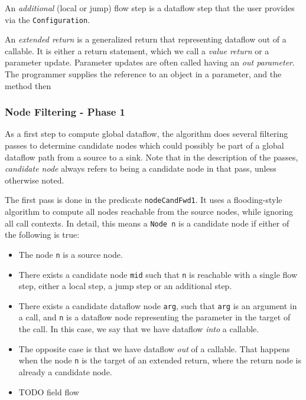 An \emph{additional} (local or jump) flow step is a dataflow step that the user 
provides via the \texttt{Configuration}.


An \emph{extended return} is a generalized return that representing dataflow out of a callable.
It is either a return statement, which we call a \emph{value return} or a parameter update.
Parameter updates are often called having an \emph{out parameter}.
The programmer supplies the reference to an object in a parameter, and the method then

\subsubsection*{Node Filtering - Phase 1}
As a first step to compute global dataflow, the algorithm does several filtering passes to 
determine candidate nodes which could possibly be part of a global dataflow path from
a source to a sink.
Note that in the description of the passes, \emph{candidate node} always refers
to being a candidate node in that pass, unless otherwise noted.

The first pass is done in the predicate \texttt{nodeCandFwd1}.
It uses a flooding-style algorithm to compute all nodes reachable from the source nodes,
while ignoring all call contexts.
In detail, this means a \texttt{Node n} is a candidate node if either of the following is true:
\begin{itemize}
    \item The node \texttt{n} is a source node.
    \item There exists a candidate node \texttt{mid} such that \texttt{n} is reachable with a single flow step,
    either a local step, a jump step or an additional step.
    \item There exists a candidate dataflow node \texttt{arg}, such that \texttt{arg} is an argument in 
    a call, and \texttt{n} is a dataflow node representing the parameter in the target of the call.
    In this case, we say that we have dataflow \emph{into} a callable.
    \item The opposite case is that we have dataflow \emph{out} of a callable.
    That happens when the node \texttt{n} is the target of an extended return, 
    where the return node is already a candidate node.
    \item TODO field flow
\end{itemize}

